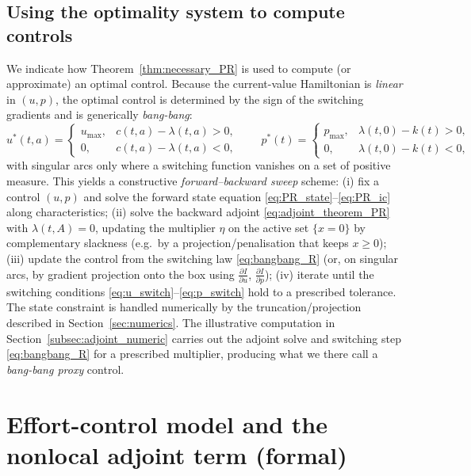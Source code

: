 \documentclass[pdflatex,sn-mathphys-num]{sn-jnl}
\theoremstyle{definition}
\theoremstyle{remark}
\begin{document}
\subsection{Using the optimality system to compute controls}
\label{subsec:numerical_use_R}

We indicate how Theorem~\ref{thm:necessary_PR} is used to compute (or
approximate) an optimal control. Because the
current-value Hamiltonian is \emph{linear} in $(u,p)$, the optimal control is
determined by the sign of the switching gradients and is generically
\emph{bang-bang}:
\begin{equation}\label{eq:bangbang_R}
u^\ast(t,a)=
\begin{cases}
u_{\max}, & c(t,a)-\lambda(t,a)>0,\\
0, & c(t,a)-\lambda(t,a)<0,
\end{cases}
\qquad
p^\ast(t)=
\begin{cases}
p_{\max}, & \lambda(t,0)-k(t)>0,\\
0, & \lambda(t,0)-k(t)<0,
\end{cases}
\end{equation}
with singular arcs only where a switching function vanishes on a set of
positive measure. This yields a constructive \emph{forward--backward sweep}
scheme: (i) fix a control $(u,p)$ and solve the forward state equation
\eqref{eq:PR_state}--\eqref{eq:PR_ic} along characteristics; (ii) solve the
backward adjoint \eqref{eq:adjoint_theorem_PR} with $\lambda(t,A)=0$,
updating the multiplier $\eta$ on the active set $\{x=0\}$ by complementary
slackness (e.g.\ by a projection/penalisation that keeps $x\ge0$); (iii)
update the control from the switching law \eqref{eq:bangbang_R} (or, on
singular arcs, by gradient projection onto the box using
$\frac{\partial I}{\partial u}$, $\frac{\partial I}{\partial p}$); (iv)
iterate until the switching conditions \eqref{eq:u_switch}--\eqref{eq:p_switch}
hold to a prescribed tolerance. The state constraint is handled numerically
by the truncation/projection described in Section~\ref{sec:numerics}. The
illustrative computation in Section~\ref{subsec:adjoint_numeric} carries out
the adjoint solve and switching step \eqref{eq:bangbang_R} for a prescribed
multiplier, producing what we there call a \emph{bang-bang proxy} control.


\section{Effort-control model and the nonlocal adjoint term (formal)}
\label{sec:effort}
\end{document}
